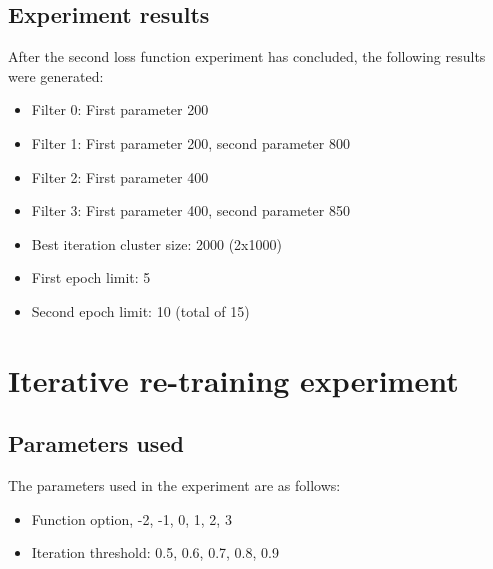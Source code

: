 \subsection{Experiment results}

After the second loss function experiment has concluded, the following results were generated:

\begin{itemize}
    \item Filter 0: First parameter 200
    \item Filter 1: First parameter 200, second parameter 800
    \item Filter 2: First parameter 400
    \item Filter 3: First parameter 400, second parameter 850
    \item Best iteration cluster size: 2000 (2x1000)
    \item First epoch limit: 5
    \item Second epoch limit: 10 (total of 15)
\end{itemize}





\section{Iterative re-training experiment}
\label{ex:iter-retrain}

\subsection{Parameters used}
\label{ex:iter-retrain:params}

The parameters used in the experiment are as follows:
\begin{itemize}
    \item Function option, -2, -1, 0, 1, 2, 3
    \item Iteration threshold: 0.5, 0.6, 0.7, 0.8, 0.9
\end{itemize}{}

